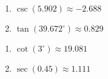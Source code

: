 \documentclass{ximera}
\begin{document}
\begin{multicols}{2}

\begin{enumerate}

\setcounter{enumi}{\value{HW}}

\item $\csc(5.902) \approx -2.688$
\item $\tan(39.672^{\circ}) \approx 0.829$

\setcounter{HW}{\value{enumi}}

\end{enumerate}

\end{multicols}

\begin{multicols}{2}

\begin{enumerate}

\setcounter{enumi}{\value{HW}}

\item $\cot(3^{\circ}) \approx 19.081$
\item $\sec(0.45) \approx 1.111$

\setcounter{HW}{\value{enumi}}

\end{enumerate}

\end{multicols}
\end{document}
